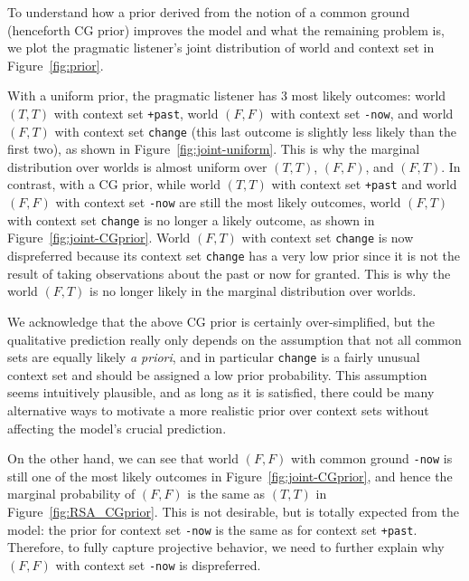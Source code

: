 To understand how a prior derived from the notion of a common ground 
 (henceforth CG prior) improves the model and what the remaining problem is, 
 we plot the pragmatic listener's joint distribution of world and context set in
 Figure~\ref{fig:prior}. 

With a uniform prior, the pragmatic listener has 3 most likely outcomes: 
 world $(T, T)$ with context set \verb=+past=, world $(F, F)$ with context set \verb=-now=, and world $(F, T)$ with context set \verb=change= (this last outcome
 is slightly less likely than the first two), as shown in Figure~\ref{fig:joint-uniform}.
This is why the marginal distribution over worlds is almost uniform over 
 $(T, T)$, $(F, F)$, and $(F, T)$.
In contrast, with a CG prior, while world $(T, T)$ with context set \verb=+past=
 and world $(F, F)$ with context set \verb=-now= are still the most likely outcomes,
 world $(F, T)$ with context set \verb=change= is no longer a likely outcome, 
 as shown in Figure~\ref{fig:joint-CGprior}.
World $(F, T)$ with context set \verb=change= is now dispreferred because 
 its context set \verb=change= has a very low prior since it is not the result 
 of taking observations about the past or now for granted.
This is why the world $(F, T)$ is no longer likely in the marginal distribution
 over worlds.

We acknowledge that the above CG prior is certainly over-simplified, 
 but the qualitative prediction really only depends on the 
 assumption that not all common sets are equally likely \emph{a priori}, and 
 in particular \verb=change= is a fairly unusual context set and 
 should be assigned a low prior probability.
This assumption seems intuitively plausible, and as long as it is satisfied, 
 there could be many alternative ways to motivate a more realistic prior over 
 context sets without affecting the model's crucial prediction.
 
On the other hand, we can see that world $(F, F)$ with common ground \verb=-now= 
 is still one of the most likely outcomes in Figure~\ref{fig:joint-CGprior}, and
 hence the marginal probability of $(F, F)$ is the same as $(T, T)$ in Figure~\ref{fig:RSA_CGprior}.
This is not desirable, but is totally expected from the model: 
 the prior for context set \verb=-now= is the same as for context set \verb=+past=. 
Therefore, to fully capture projective behavior, we need to further
 explain why $(F, F)$ with context set \verb=-now= is dispreferred.


